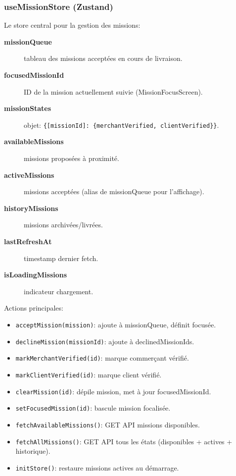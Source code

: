\subsubsection{useMissionStore (Zustand)}

Le store central pour la gestion des missions:

\begin{description}
    \item[\textbf{missionQueue}] tableau des missions acceptées en cours de livraison.
    \item[\textbf{focusedMissionId}] ID de la mission actuellement suivie (MissionFocusScreen).
    \item[\textbf{missionStates}] objet: \texttt{\{[missionId]: \{merchantVerified, clientVerified\}\}}.
    \item[\textbf{availableMissions}] missions proposées à proximité.
    \item[\textbf{activeMissions}] missions acceptées (alias de missionQueue pour l'affichage).
    \item[\textbf{historyMissions}] missions archivées/livrées.
    \item[\textbf{lastRefreshAt}] timestamp dernier fetch.
    \item[\textbf{isLoadingMissions}] indicateur chargement.
\end{description}

Actions principales:
\begin{itemize}
    \item \texttt{acceptMission(mission)}: ajoute à missionQueue, définit focusée.
    \item \texttt{declineMission(missionId)}: ajoute à declinedMissionIds.
    \item \texttt{markMerchantVerified(id)}: marque commerçant vérifié.
    \item \texttt{markClientVerified(id)}: marque client vérifié.
    \item \texttt{clearMission(id)}: dépile mission, met à jour focusedMissionId.
    \item \texttt{setFocusedMission(id)}: bascule mission focalisée.
    \item \texttt{fetchAvailableMissions()}: GET API missions disponibles.
    \item \texttt{fetchAllMissions()}: GET API tous les états (disponibles + actives + historique).
    \item \texttt{initStore()}: restaure missions actives au démarrage.
\end{itemize}

